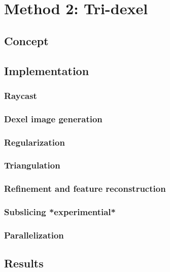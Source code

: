 
\chapter{Method 2: Tri-dexel}
\label{ch:tri_dexel}



\section{Concept}
\label{sec:tri_dexel_concept}



\section{Implementation}
\label{sec:tri_dexel_implementation}



\subsection{Raycast}
\label{sec:tri_dexel_raycast}



\subsection{Dexel image generation}
\label{sec:tri_dexel_dexel_image_generation}



\subsection{Regularization}
\label{sec:tri_dexel_regularization}



\subsection{Triangulation}
\label{sec:tri_dexel_triangulation}



\subsection{Refinement and feature reconstruction}
\label{sec:tri_dexel_refinement}



\subsection{Subslicing *experimential*}
\label{sec:tri_dexel_subslicing}



\subsection{Parallelization}
\label{sec:tri_dexel_parallelization}



\section{Results}
\label{sec:tri_dexel_results}


